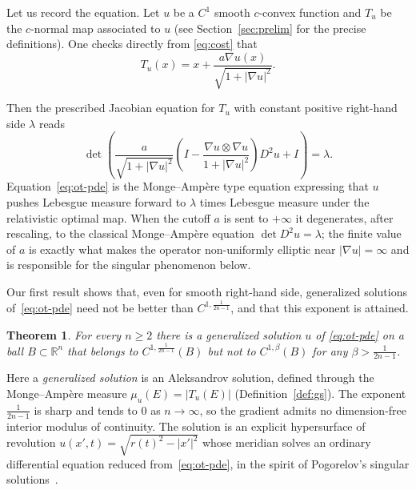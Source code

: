 \documentclass[12pt,letterpaper]{amsart}
\theoremstyle{definition}
\theoremstyle{plain}
\newtheorem{theorem}[definition]{Theorem}
\numberwithin{equation}{section}
\newcommand{\R}{\mathbb{R}}
\newcommand{\D}{\nabla}
\begin{document}
Let us record the equation. Let $u$ be a $C^1$ smooth $c$-convex function and $T_u$ be the $c$-normal map associated to $u$ (see Section~\ref{sec:prelim} for the precise definitions).
One checks directly from \eqref{eq:cost} that
\begin{equation}\label{eq:T_u}
    T_u(x)=x+\frac{a\D u(x)}{\sqrt{1+|\D u|^2}}.
\end{equation}

Then the prescribed Jacobian equation for $T_u$ with constant positive right-hand side $\lambda$ reads
\begin{equation}\label{eq:ot-pde}
  \det\left(
    \frac{a}{\sqrt{1+|\D u|^2}}
    \left(I-\frac{\D u\otimes\D u}{1+|\D u|^2}\right)D^2u+I
  \right)=\lambda.
\end{equation}
Equation~\eqref{eq:ot-pde} is the Monge--Amp\`ere type equation expressing that $u$ pushes
Lebesgue measure forward to $\lambda$ times Lebesgue measure under the relativistic optimal
map. When the cutoff $a$ is sent to $+\infty$ it degenerates, after rescaling, to the
classical Monge--Amp\`ere equation $\det D^2 u=\lambda$; the finite value of $a$ is exactly
what makes the operator non-uniformly elliptic near $|\D u|=\infty$ and is responsible for the
singular phenomenon below.

Our first result shows that, even for smooth right-hand side, generalized solutions
of~\eqref{eq:ot-pde} need not be better than $C^{1,\frac{1}{2n-1}}$, and that this exponent is
attained.

\begin{theorem}\label{thm:A}
    For every $n\geq2$ there is a generalized solution $u$ of \eqref{eq:ot-pde} on a ball
    $B\subset\R^n$ that belongs to $C^{1,\frac{1}{2n-1}}(B)$ but not to $C^{1,\beta}(B)$ for any
    $\beta>\frac{1}{2n-1}$.
\end{theorem}

Here a {\it generalized solution} is an Aleksandrov solution, defined through the
Monge--Amp\`ere measure $\mu_u(E)=|T_u(E)|$ (Definition~\ref{def:gs}). The exponent
$\frac{1}{2n-1}$ is sharp and tends to $0$ as $n\to\infty$, so the gradient admits no
dimension-free interior modulus of continuity. The solution is an explicit hypersurface of
revolution $u(x',t)=\sqrt{r(t)^2-|x'|^2}$ whose meridian solves an ordinary differential
equation reduced from~\eqref{eq:ot-pde}, in the spirit of Pogorelov's singular
solutions~\cite{Po78}.
\end{document}
